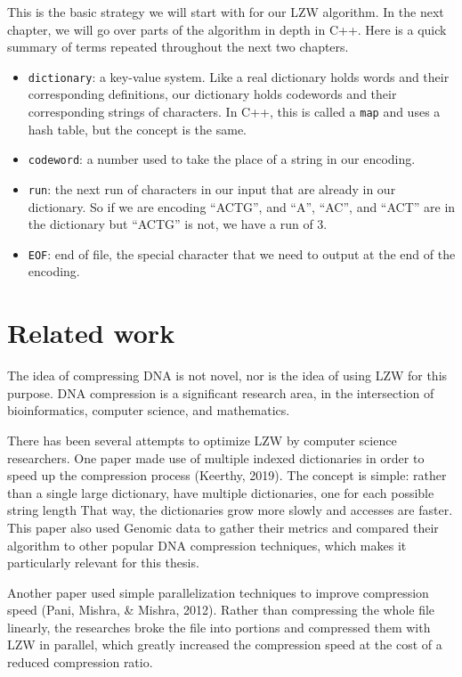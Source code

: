 \documentclass[12pt,twoside]{reedthesis}
\providecommand{\tightlist}{%
  \setlength{\itemsep}{0pt}\setlength{\parskip}{0pt}}
\begin{document}
This is the basic strategy we will start with for our LZW algorithm. In the next chapter, we will go over parts of the algorithm in depth in C++. Here is a quick summary of terms repeated throughout the next two chapters.
\begin{itemize}
\tightlist
\item
  \texttt{dictionary}: a key-value system. Like a real dictionary holds words and their corresponding definitions, our dictionary holds codewords and their corresponding strings of characters. In C++, this is called a \texttt{map} and uses a hash table, but the concept is the same.
\item
  \texttt{codeword}: a number used to take the place of a string in our encoding.
\item
  \texttt{run}: the next run of characters in our input that are already in our dictionary. So if we are encoding ``ACTG'', and ``A'', ``AC'', and ``ACT'' are in the dictionary but ``ACTG'' is not, we have a run of 3.
\item
  \texttt{EOF}: end of file, the special character that we need to output at the end of the encoding.
\end{itemize}
\hypertarget{related-work}{%
\section{Related work}\label{related-work}}

The idea of compressing DNA is not novel, nor is the idea of using LZW for this purpose. DNA compression is a significant research area, in the intersection of bioinformatics, computer science, and mathematics.

There has been several attempts to optimize LZW by computer science researchers. One paper made use of multiple indexed dictionaries in order to speed up the compression process (Keerthy, 2019). The concept is simple: rather than a single large dictionary, have multiple dictionaries, one for each possible string length That way, the dictionaries grow more slowly and accesses are faster. This paper also used Genomic data to gather their metrics and compared their algorithm to other popular DNA compression techniques, which makes it particularly relevant for this thesis.

Another paper used simple parallelization techniques to improve compression speed (Pani, Mishra, \& Mishra, 2012). Rather than compressing the whole file linearly, the researches broke the file into portions and compressed them with LZW in parallel, which greatly increased the compression speed at the cost of a reduced compression ratio.
\end{document}
